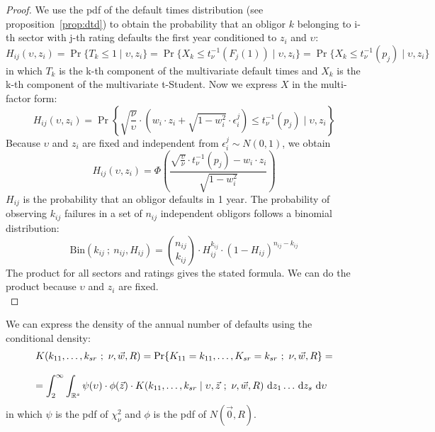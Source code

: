 \documentclass[11pt,fleqn]{book} %
\begin{document}
\begin{proof}
	We use the pdf of the default times distribution (see 
	proposition~\ref{prop:dtd}) to obtain the probability that an obligor 
	$k$ belonging to i-th sector with j-th rating defaults the first year 
	conditioned to $z_i$ and $\upsilon$:
	\begin{displaymath}
		H_{ij}(\upsilon,z_i) = 
		\Pr\{T_k \le 1 \mid \upsilon, z_i\} = 
		\Pr\{ X_k \le t_{\nu}^{-1}(F_j(1)) \mid \upsilon, z_i\} = 
		\Pr\{ X_k \le t_{\nu}^{-1}(p_j) \mid \upsilon, z_i\}
	\end{displaymath}
	in which $T_k$ is the k-th component of the multivariate default times 
	and $X_k$ is the k-th component of the multivariate t-Student. 
	Now we express $X$ in the multi-factor form:
	\begin{displaymath}
		H_{ij}(\upsilon,z_i) = \Pr \left\{ 
		\sqrt{\frac{\nu}{\upsilon}} \cdot \left( w_i \cdot z_i + \sqrt{1-w_i^2} \cdot \epsilon_i^j\right)
		\le t_{\nu}^{-1}(p_j) \mid \upsilon, z_i
		\right\}
	\end{displaymath}
	Because $\upsilon$ and $z_i$ are fixed and independent from 
	$\epsilon_i^j \sim N(0,1)$, we obtain
	\begin{displaymath}
		H_{ij}(\upsilon,z_i) = \Phi\left(  
		\frac{\sqrt{\frac{\upsilon}{\nu}} \cdot t_{\nu}^{-1}(p_j) - w_i\cdot z_i}{\sqrt{1-w_i^2}}
		\right)
	\end{displaymath}
	$H_{ij}$ is the probability that an obligor defaults in 1 year. The 
	probability of observing $k_{ij}$ failures in a set of $n_{ij}$ independent
	obligors follows a binomial distribution:
	\begin{displaymath}
		\text{Bin}(k_{ij}\ ;\ n_{ij},H_{ij}) = 
		\binom{n_{ij}}{k_{ij}} \cdot H_{ij}^{k_{ij}} \cdot (1-H_{ij})^{n_{ij}-k_{ij}}
	\end{displaymath}
	The product for all sectors and ratings gives the stated formula. 
	We can do the product because $\upsilon$ and $z_i$ are fixed.
	\\
\end{proof}

\begin{corollary}
	We can express the density of the annual number of defaults using 
	the conditional density:
	\begin{displaymath}
		\begin{array}{l}
			K(k_{11},\dots,k_{sr}\ ;\ \nu, \vec{w}, R) = 
			\Pr\{K_{11}=k_{11},\dots,K_{sr}=k_{sr}\ ;\ \nu, \vec{w}, R\} = \\
			\\
			= \displaystyle \int_2^{\infty} \int_{\mathbb{R}^s}
			\psi(\upsilon) \cdot \phi(\vec{z}) \cdot
			K(k_{11},\dots,k_{sr} \mid \upsilon,\vec{z}\ ;\ \nu,\vec{w}, R) 
			\mathop{\,\mathrm{{}d}}\mathopen{} z_1 \dots \mathop{\,\mathrm{{}d}}\mathopen{} z_s \mathop{\,\mathrm{{}d}}\mathopen{} \upsilon
		\end{array}
	\end{displaymath}
	in which $\psi$ is the pdf of $\chi_{\nu}^2$ and $\phi$ is the pdf 
	of $N(\vec{0},R)$.
\end{corollary}
\end{document}

